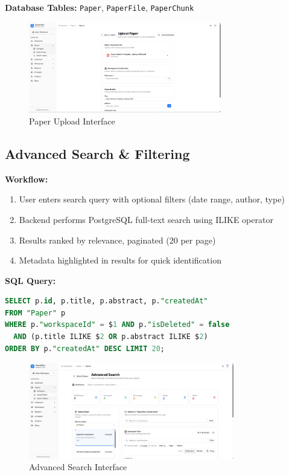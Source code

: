 \textbf{Database Tables:} \texttt{Paper}, \texttt{PaperFile}, \texttt{PaperChunk}

\begin{figure}[H]
\centering
\includegraphics[width=0.75\textwidth]{images/screenshots/paper_upload.png}
\caption{Paper Upload Interface}
\label{fig:upload}
\end{figure}

\subsection{Advanced Search \& Filtering}

\textbf{Workflow:}
\begin{enumerate}[leftmargin=*,topsep=3pt,itemsep=2pt]
    \item User enters search query with optional filters (date range, author, type)
    \item Backend performs PostgreSQL full-text search using ILIKE operator
    \item Results ranked by relevance, paginated (20 per page)
    \item Metadata highlighted in results for quick identification
\end{enumerate}

\textbf{SQL Query:}
\begin{lstlisting}[language=SQL,basicstyle=\tiny\ttfamily]
SELECT p.id, p.title, p.abstract, p."createdAt"
FROM "Paper" p
WHERE p."workspaceId" = $1 AND p."isDeleted" = false
  AND (p.title ILIKE $2 OR p.abstract ILIKE $2)
ORDER BY p."createdAt" DESC LIMIT 20;
\end{lstlisting}

\begin{figure}[H]
\centering
\includegraphics[width=0.8\textwidth]{images/screenshots/advanced_search.png}
\caption{Advanced Search Interface}
\label{fig:search}
\end{figure}

